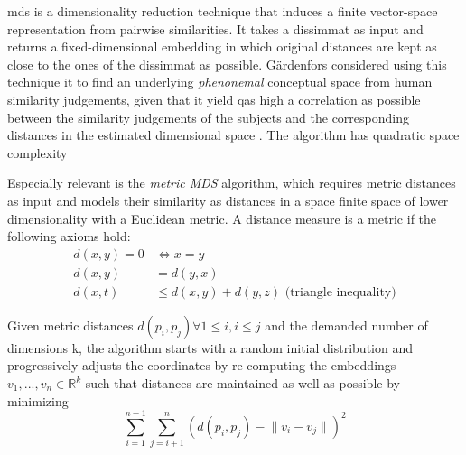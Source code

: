 \Gls{mds} \cite{Mead1992} is a dimensionality reduction technique that induces a finite vector-space representation from pairwise similarities. It takes a \gls{dissimmat} as input and returns a fixed-dimensional embedding in which original distances are kept as close to the ones of the \gls{dissimmat} as possible. Gärdenfors considered using this technique it to find an underlying \textit{phenonemal} conceptual space from human similarity judgements, given that it yield q{as high a correlation as possible between the similarity judgements of the subjects and the corresponding distances in the estimated dimensional space} \cite[22]{Gardenfors2000a}. The algorithm has quadratic space complexity \cite{Alshaikh2021}

Especially relevant is the \textit{metric MDS} algorithm, which requires metric distances as input and models their similarity as distances in a space finite space of lower dimensionality with a Euclidean metric. A distance measure is a metric if the following axioms hold:
\vspace{-2ex}
\begin{align}
    d(x,y) = 0 &\Leftrightarrow x = y \\
    d(x,y) &= d(y,x) \\
    d(x,t) &\leq d(x,y) + d(y,z) \text{ (triangle inequality)}
\end{align}

Given metric distances $d(p_i, p_j) \forall 1 \leq i, i \leq j$ and the demanded number of dimensions k, the algorithm starts with a random initial distribution and progressively adjusts the coordinates by re-computing the embeddings $v_1, ..., v_n \in \mathds{R}^k$ such that distances are maintained as well as possible by minimizing 
\vspace{-2ex}
$$ \sum_{i=1}^{n-1}\sum_{j=i+1}^{n}(d(p_i, p_j) - \lVert v_i - v_j \rVert)^2 $$

